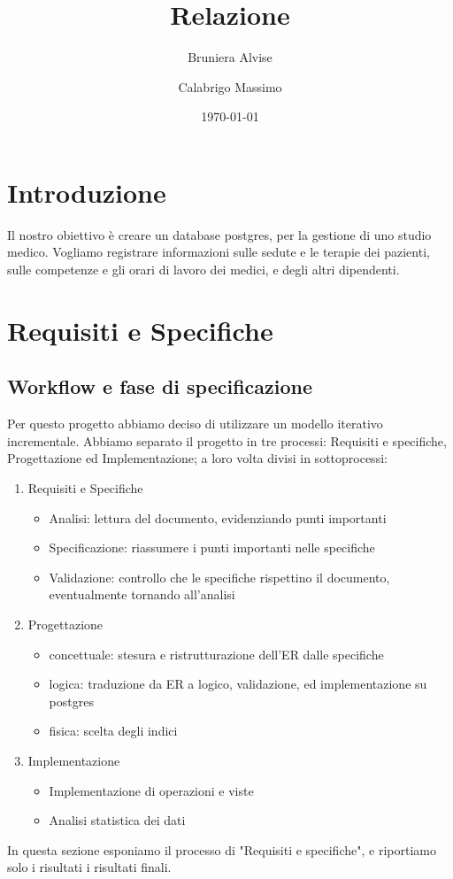 \documentclass[11pt]{article}
\title{Relazione}
\author{Bruniera Alvise\and Calabrigo Massimo}
\affil{Università degli studi di Udine}
\date{\today}
\begin{document}
\maketitle

\tableofcontents
\section{Introduzione}
Il nostro obiettivo è creare un database postgres, per la gestione di uno studio medico.
Vogliamo registrare informazioni sulle sedute e le terapie dei pazienti, sulle competenze e gli orari di lavoro dei medici, e degli altri dipendenti.
\section{Requisiti e Specifiche}

\subsection{Workflow e fase di specificazione}
Per questo progetto abbiamo deciso di utilizzare un modello iterativo incrementale.
Abbiamo separato il progetto in tre processi: Requisiti e specifiche, Progettazione ed Implementazione;
a loro volta divisi in sottoprocessi:
\begin{enumerate}
    \item Requisiti e Specifiche
    \begin{itemize}
        \item Analisi: lettura del documento, evidenziando punti importanti
        \item Specificazione: riassumere i punti importanti nelle specifiche
        \item Validazione: controllo che le specifiche rispettino il documento, eventualmente tornando all'analisi
    \end{itemize}
    \item Progettazione
    \begin{itemize}
        \item concettuale: stesura e ristrutturazione dell'ER dalle specifiche
        \item logica: traduzione da ER a logico, validazione, ed implementazione su postgres
        \item fisica: scelta degli indici
    \end{itemize}
    \item Implementazione
    \begin{itemize}
        \item Implementazione di operazioni e viste
        \item Analisi statistica dei dati
    \end{itemize}
\end{enumerate}
In questa sezione esponiamo il processo di "Requisiti e specifiche", e riportiamo
solo i risultati i risultati finali.
\end{document}
